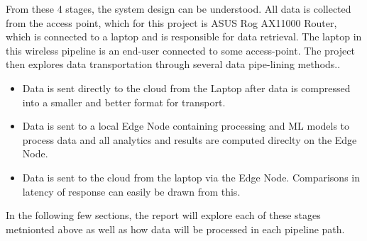 From these 4 stages, the system design can be understood. All data is collected from the access point, which for this project is ASUS Rog AX11000 Router, which is connected to a laptop and is responsible for data retrieval. The laptop in this wireless pipeline is an end-user connected to some access-point. The project then explores data transportation through several data pipe-lining methods..
\begin{itemize}
    \item Data is sent directly to the cloud from the Laptop after data is compressed into a smaller and better format for transport.
    \item Data is sent to a local Edge Node containing processing and ML models to process data and all analytics and results are computed direclty on the Edge Node.
    \item Data is sent to the cloud from the laptop via the Edge Node. Comparisons in latency of response can easily be drawn from this.
\end{itemize}

In the following few sections, the report will explore each of these stages metnionted above as well as how data will be processed in each pipeline path.













